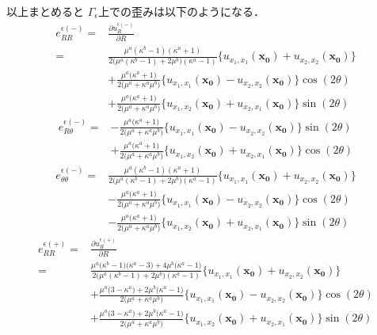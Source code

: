以上まとめると
$\Gamma_\epsilon$上での歪みは以下のようになる．
\begin{align}
	e_{RR}^{\epsilon(-)}
	=&\frac{\partial u_{R}^{\epsilon(-)}}{\partial R}
	\nonumber
	\\
	=&\frac{\mu^{a}(\kappa^{b}-1)(\kappa^{a}+1)}{2\bigl(\mu^{a}(\kappa^{b}-1)+2\mu^{b}\bigr)(\kappa^{a}-1)}
	\bigl\{u_{x_{1},x_{1}}(\bm{x_{0}})+u_{x_{2},x_{2}}(\bm{x_{0}})\bigr\}
	\nonumber
	\\
	&+\frac{\mu^{a}\bigl(\kappa^{a}+1\bigr)}{2\bigl(\mu^{a}+\kappa^{a}\mu^{b}\bigr)}
	\bigl\{u_{x_{1},x_{1}}(\bm{x_{0}})-u_{x_{2},x_{2}}(\bm{x_{0}})\bigr\}\cos(2\theta)
	\nonumber
	\\
	&+\frac{\mu^{a}\bigl(\kappa^{a}+1\bigr)}{2\bigl(\mu^{a}+\kappa^{a}\mu^{b}\bigr)}
	\bigl\{u_{x_{1},x_{2}}(\bm{x_{0}})+u_{x_{2},x_{1}}(\bm{x_{0}})\bigr\}\sin(2\theta)
	\label{eq:eRRInEpsSol}
\end{align}
\begin{align}
	e_{R\theta}^{\epsilon(-)}
	=&-\frac{\mu^{a}\bigl(\kappa^{a}+1\bigr)}{2\bigl(\mu^{a}+\kappa^{a}\mu^{b}\bigr)}
	\bigl\{u_{x_{1},x_{1}}(\bm{x_{0}})-u_{x_{2},x_{2}}(\bm{x_{0}})\bigr\}\sin(2\theta)
	\nonumber
	\\
	&+\frac{\mu^{a}\bigl(\kappa^{a}+1\bigr)}{2\bigl(\mu^{a}+\kappa^{a}\mu^{b}\bigr)}
	\bigl\{u_{x_{1},x_{2}}(\bm{x_{0}})+u_{x_{2},x_{1}}(\bm{x_{0}})\bigr\}\cos(2\theta)
	\label{eq:eRThInEpsSol}
\end{align}
\begin{align}
	e_{\theta\theta}^{\epsilon(-)}
	=&\frac{\mu^{a}(\kappa^{b}-1)(\kappa^{a}+1)}{2\bigl(\mu^{a}(\kappa^{b}-1)+2\mu^{b}\bigr)(\kappa^{a}-1)}
	\bigl\{u_{x_{1},x_{1}}(\bm{x_{0}})+u_{x_{2},x_{2}}(\bm{x_{0}})\bigr\}
	\nonumber
	\\
	&-\frac{\mu^{a}\bigl(\kappa^{a}+1\bigr)}{2\bigl(\mu^{a}+\kappa^{a}\mu^{b}\bigr)}
	\bigl\{u_{x_{1},x_{1}}(\bm{x_{0}})-u_{x_{2},x_{2}}(\bm{x_{0}})\bigr\}\cos(2\theta)
	\nonumber
	\\
	&-\frac{\mu^{a}\bigl(\kappa^{a}+1\bigr)}{2\bigl(\mu^{a}+\kappa^{a}\mu^{b}\bigr)}
	\bigl\{u_{x_{1},x_{2}}(\bm{x_{0}})+u_{x_{2},x_{1}}(\bm{x_{0}})\bigr\}\sin(2\theta)
	\label{eq:eThThInEpsSol}
\end{align}
\begin{align}
	e_{RR}^{\epsilon(+)}
	=&\frac{\partial u_{R}^{\epsilon(+)}}{\partial R}
	\nonumber
	\\
	=&\frac{ \mu^{a}\bigl(\kappa^{b}-1\bigr)\bigl(\kappa^{a}-3\bigr)+4\mu^{b}\bigl(\kappa^{a}-1\bigr)　}
		{2\bigl(\mu^{a}(\kappa^{b}-1)+2\mu^{b}\bigr)(\kappa^{a}-1)}
	\bigl\{u_{x_{1},x_{1}}(\bm{x_{0}})+u_{x_{2},x_{2}}(\bm{x_{0}})\bigr\}
	\nonumber
	\\
	&+\frac{\mu^{a}\bigl(3-\kappa^{a}\bigr)+2\mu^{b}\bigl(\kappa^{a}-1\bigr)}{2\bigl(\mu^{a}+\kappa^{a}\mu^{b}\bigr)}
	\bigl\{u_{x_{1},x_{1}}(\bm{x_{0}})-u_{x_{2},x_{2}}(\bm{x_{0}})\bigr\}\cos(2\theta)
	\nonumber
	\\
	&+\frac{\mu^{a}\bigl(3-\kappa^{a}\bigr)+2\mu^{b}\bigl(\kappa^{a}-1\bigr)}{2\bigl(\mu^{a}+\kappa^{a}\mu^{b}\bigr)}
	\bigl\{u_{x_{1},x_{2}}(\bm{x_{0}})+u_{x_{2},x_{1}}(\bm{x_{0}})\bigr\}\sin(2\theta)
	\label{eq:eRROutEpsSol}
\end{align}
